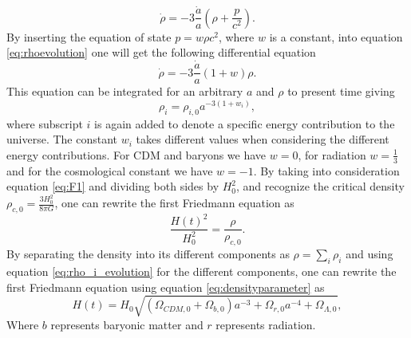 \begin{equation}\label{eq:rhoevolution}
    \dot{\rho}=-3\frac{\dot{a}}{a}(\rho+\frac{p}{c^2}).
\end{equation}
By inserting the equation of state $p=w\rho c^2$, where $w$ is a constant,
into equation \ref{eq:rhoevolution} one will get the following differential
equation
\begin{equation}
    \dot{\rho}=-3\frac{\dot{a}}{a}(1+w)\rho.
\end{equation}
This equation can be integrated for an arbitrary $a$ and $\rho$ to present time
giving
\begin{equation}\label{eq:rho_i_evolution}
    \rho_i=\rho_{i,0}a^{-3(1+w_i)},
\end{equation}
where subscript $i$ is again added to denote a specific energy contribution to
the universe. The constant $w_i$ takes different values when considering the
different energy contributions. For CDM and baryons we have $w=0$, for
radiation $w=\frac{1}{3}$ and for the cosmological constant we have $w=-1$. By
taking into consideration equation \ref{eq:F1} and dividing both sides by $H_0^2$,
and recognize the critical density $\rho_{c,0}=\frac{3H_0^2}{8\pi G}$, one can
rewrite the first Friedmann equation as
\begin{equation}
    \frac{H(t)^2}{H_0^2}=\frac{\rho}{\rho_{c,0}}.
\end{equation}
By separating the density into its different components as $\rho=\sum_i\rho_i$
and using equation \ref{eq:rho_i_evolution} for the different components, one can rewrite
the first Friedmann equation using equation \ref{eq:densityparameter} as
\begin{equation}
    H(t)=H_0\sqrt{(\Omega_{CDM,0} + \Omega_{b,0})a^{-3} + \Omega_{r,0}a^{-4} + \Omega_{\Lambda,0}},
\end{equation}
Where $b$ represents baryonic matter and $r$ represents radiation.

